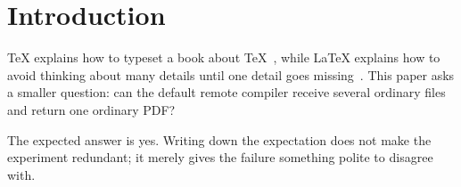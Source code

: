 \section{Introduction}

TeX explains how to typeset a book about TeX~\cite{knuth1984texbook}, while
LaTeX explains how to avoid thinking about many details until one detail goes
missing~\cite{lamport1994latex}. This paper asks a smaller question: can the
default remote compiler receive several ordinary files and return one ordinary
PDF?

The expected answer is yes. Writing down the expectation does not make the
experiment redundant; it merely gives the failure something polite to
disagree with.
